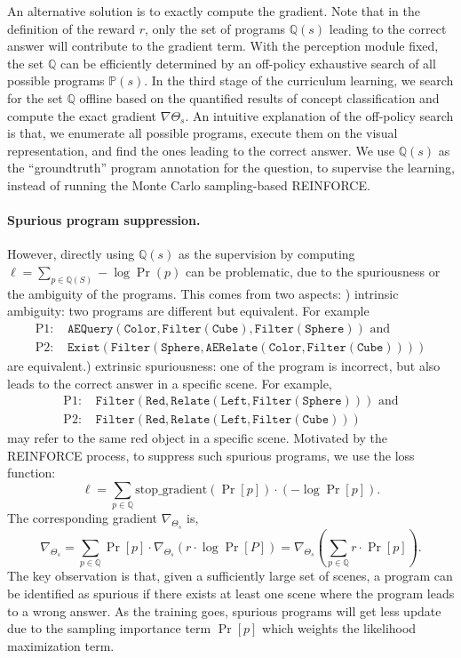\documentclass{article} \usepackage{iclr2019_conference,times}
\begin{document}
An alternative solution is to exactly compute the gradient. Note that in the definition of the reward $r$, only the set of programs $\mathbb Q(s)$ leading to the correct answer will contribute to the gradient term. With the perception module fixed, the set $\mathbb Q$ can be efficiently determined by an off-policy exhaustive search of all possible programs $\mathbb P(s)$. In the third stage of the curriculum learning, we search for the set $\mathbb Q$ offline based on the quantified results of concept classification and compute the exact gradient $\nabla \Theta_s$. An intuitive explanation of the off-policy search is that, we enumerate all possible programs, execute them on the visual representation, and find the ones leading to the correct answer. We use $\mathbb Q(s)$ as the ``groundtruth'' program annotation for the question, to supervise the learning, instead of running the Monte Carlo sampling-based REINFORCE.

\paragraph{Spurious program suppression.}
However, directly using $\mathbb Q(s)$ as the supervision by computing $\ell = \sum_{p \in \mathbb Q(S)} -\log \Pr(p)$ can be problematic, due to the spuriousness or the ambiguity of the programs. This comes from two aspects: ) intrinsic ambiguity: two programs are different but equivalent. For example
\begin{align*}
    \text{P1: }&\texttt{AEQuery}(\texttt{Color}, \texttt{Filter}(\texttt{Cube}), \texttt{Filter}(\texttt{Sphere})) \text{~and}\\
    \text{P2: }&\texttt{Exist}(\texttt{Filter}(\texttt{Sphere}, \texttt{AERelate}(\texttt{Color}, \texttt{Filter}(\texttt{Cube}))))
\end{align*}
are equivalent.) extrinsic spuriousness: one of the program is incorrect, but also leads to the correct answer in a specific scene. For example,
\begin{align*}
    \text{P1: }& \texttt{Filter}(\texttt{Red}, \texttt{Relate}(\texttt{Left}, \texttt{Filter}(\texttt{Sphere}))) \text{~and}\\
    \text{P2: }&\texttt{Filter}(\texttt{Red}, \texttt{Relate}(\texttt{Left}, \texttt{Filter}(\texttt{Cube})))
\end{align*}
may refer to the same red object in a specific scene. Motivated by the REINFORCE process, to suppress such spurious programs, we use the loss function: 
\[ \ell = \sum_{p \in \mathbb{Q}} \text{stop\_gradient}(\Pr[p]) \cdot (-\log \Pr[p]). \]
The corresponding gradient $\nabla_{\Theta_s}$ is,
\[ \nabla_{\Theta_s} = \sum_{p \in \mathbb{Q}} \Pr[p] \cdot \nabla_{\Theta_s}\left(r \cdot \log \Pr[P]\right) = \nabla_{\Theta_s} \left( \sum_{p \in \mathbb{Q}} r \cdot \Pr[p] \right). \]
The key observation is that, given a sufficiently large set of scenes, a program can be identified as spurious if there exists at least one scene where the program leads to a wrong answer. As the training goes, spurious programs will get less update due to the sampling importance term $\Pr[p]$ which weights the likelihood maximization term.
\end{document}
